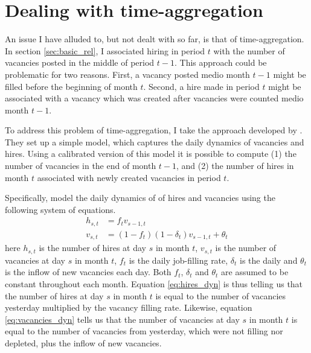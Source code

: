 \section{Dealing with time-aggregation}
\label{sec:time_agg}

An issue I have alluded to, but not dealt with so far, is that of time-aggregation. In section \ref{sec:basic_rel}, I associated 
 hiring in period $t$ with the number of vacancies posted in the middle of period $t-1$. This approach could be problematic for two reasons. First, a vacancy posted medio month $t-1$ might be filled before the beginning of month $t$. Second, a hire made in period $t$ might be associated with a vacancy which was created after vacancies were counted medio month $t-1$. 
 
To address this problem of time-aggregation, I take the approach developed by \cite{Davis2013}. They set up a simple model, which captures the daily dynamics of vacancies and hires. Using a calibrated version of this model it is possible to compute (1) the number of vacancies in the end of month $t-1$, and (2) the number of hires in month $t$ associated with newly created vacancies in period $t$. 

Specifically, \cite{Davis2013} model the daily dynamics of of hires and vacancies using the following system of equations.
\begin{align}
h_{s,t}&=f_t v_{s-1,t} \label{eq:hires_dyn} \\
v_{s,t}&=(1-f_t)(1-\delta_t)v_{s-1,t} + \theta_t \label{eq:vacancies_dyn} 
\end{align}
here $h_{s,t}$ is the number of hires at day $s$ in month $t$, $v_{s,t}$ is the number of vacancies at day $s$ in month $t$, $f_t$ is the daily job-filling rate, $\delta_t$ is the daily and $\theta_t$ is the inflow of new vacancies each day. Both $f_t$, $\delta_t$ and $\theta_t$ are assumed to be constant throughout each month. Equation \eqref{eq:hires_dyn} is thus telling us that the number of hires at day $s$ in month $t$ is equal to the number of vacancies yesterday multiplied by the vacancy filling rate. Likewise, equation \eqref{eq:vacancies_dyn} tells us that the number of vacancies at day $s$ in  month $t$ is equal to the number of vacancies from yesterday, which were not filling nor depleted, plus the inflow of new vacancies. 

